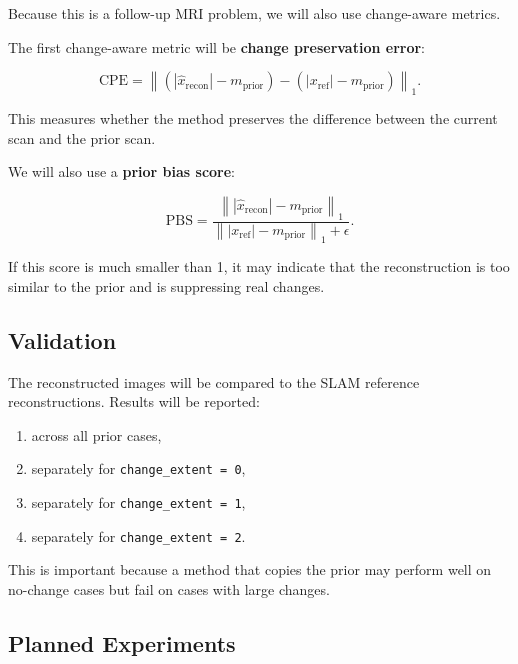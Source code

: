 \documentclass[11pt,a4paper]{article}
\begin{document}
Because this is a follow-up MRI problem, we will also use change-aware metrics.

The first change-aware metric will be \textbf{change preservation error}:

\begin{equation}
    \mathrm{CPE}
    =
    \left\|
    \left(
    |\hat{x}_{\mathrm{recon}}|
    -
    m_{\mathrm{prior}}
    \right)
    -
    \left(
    |x_{\mathrm{ref}}|
    -
    m_{\mathrm{prior}}
    \right)
    \right\|_1.
\end{equation}

This measures whether the method preserves the difference between the current scan and the prior scan.

We will also use a \textbf{prior bias score}:

\begin{equation}
    \mathrm{PBS}
    =
    \frac{
    \left\|
    |\hat{x}_{\mathrm{recon}}|
    -
    m_{\mathrm{prior}}
    \right\|_1
    }{
    \left\|
    |x_{\mathrm{ref}}|
    -
    m_{\mathrm{prior}}
    \right\|_1
    +
    \epsilon
    }.
\end{equation}

If this score is much smaller than 1, it may indicate that the reconstruction is too similar to the prior and is suppressing real changes.

\subsection{Validation}

The reconstructed images will be compared to the SLAM reference reconstructions. Results will be reported:

\begin{enumerate}
    \item across all prior cases,
    \item separately for \texttt{change\_extent = 0},
    \item separately for \texttt{change\_extent = 1},
    \item separately for \texttt{change\_extent = 2}.
\end{enumerate}

This is important because a method that copies the prior may perform well on no-change cases but fail on cases with large changes.

\subsection{Planned Experiments}
\end{document}
